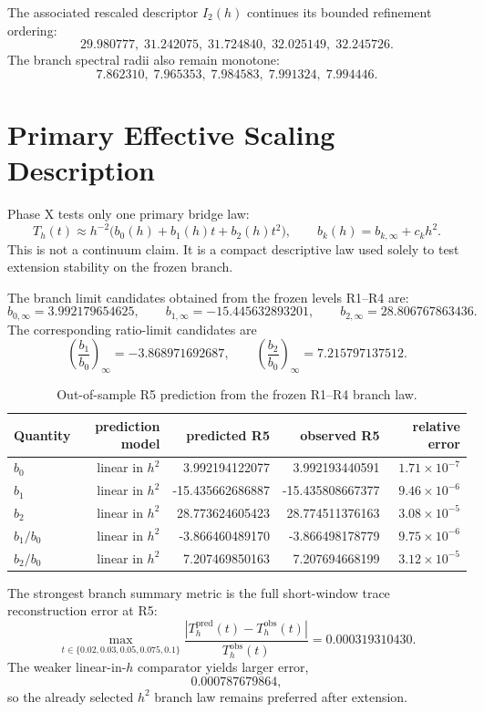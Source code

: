 \documentclass[11pt]{article}
\begin{document}
The associated rescaled descriptor $I_2(h)$ continues its bounded refinement ordering:
\[
29.980777,\;31.242075,\;31.724840,\;32.025149,\;32.245726.
\]
The branch spectral radii also remain monotone:
\[
7.862310,\;7.965353,\;7.984583,\;7.991324,\;7.994446.
\]

\section{Primary Effective Scaling Description}

Phase X tests only one primary bridge law:
\[
T_h(t) \approx h^{-2}\bigl(b_0(h) + b_1(h)t + b_2(h)t^2\bigr),
\qquad
b_k(h) = b_{k,\infty} + c_k h^2.
\]
This is not a continuum claim. It is a compact descriptive law used solely to test extension stability on the frozen branch.

The branch limit candidates obtained from the frozen levels R1--R4 are:
\[
b_{0,\infty} = 3.992179654625,\qquad
b_{1,\infty} = -15.445632893201,\qquad
b_{2,\infty} = 28.806767863436.
\]
The corresponding ratio-limit candidates are
\[
\left(\frac{b_1}{b_0}\right)_{\infty} = -3.868971692687,
\qquad
\left(\frac{b_2}{b_0}\right)_{\infty} = 7.215797137512.
\]

\begin{table}[t]
\centering
\small
\begin{tabular}{@{}lrrrr@{}}
\toprule
Quantity & prediction model & predicted R5 & observed R5 & relative error \\
\midrule
$b_0$ & linear in $h^2$ & 3.992194122077 & 3.992193440591 & $1.71 \times 10^{-7}$ \\
$b_1$ & linear in $h^2$ & -15.435662686887 & -15.435808667377 & $9.46 \times 10^{-6}$ \\
$b_2$ & linear in $h^2$ & 28.773624605423 & 28.774511376163 & $3.08 \times 10^{-5}$ \\
$b_1/b_0$ & linear in $h^2$ & -3.866460489170 & -3.866498178779 & $9.75 \times 10^{-6}$ \\
$b_2/b_0$ & linear in $h^2$ & 7.207469850163 & 7.207694668199 & $3.12 \times 10^{-5}$ \\
\bottomrule
\end{tabular}
\caption{Out-of-sample R5 prediction from the frozen R1--R4 branch law.}
\label{tab:prediction}
\end{table}

The strongest branch summary metric is the full short-window trace reconstruction error at R5:
\[
\max_{t \in \{0.02,0.03,0.05,0.075,0.1\}}
\frac{|T_h^{\mathrm{pred}}(t) - T_h^{\mathrm{obs}}(t)|}{T_h^{\mathrm{obs}}(t)}
= 0.000319310430.
\]
The weaker linear-in-$h$ comparator yields larger error,
\[
0.000787679864,
\]
so the already selected $h^2$ branch law remains preferred after extension.
\end{document}
